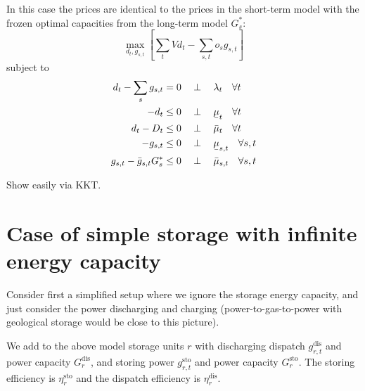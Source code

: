 \documentclass[final,3p,times]{elsarticle}
\newcommand{\ubar}[1]{\text{\b{$#1$}}}
\def\l{\lambda}
\begin{document}
In this case the prices are identical to the prices in the short-term model with the frozen optimal capacities from the long-term model $G_{s}^*$:
\begin{equation}
    \max_{d_{t}, g_{s,t}}\left[\sum_{t} V d_{t}  - \sum_{s,t} o_{s} g_{s,t} \right]  \label{eq:objs}
\end{equation}
subject to
\begin{align}
   d_{t} - \sum_s g_{s,t} & =  0 \hspace{0.34cm}\perp \hspace{0.34cm} \l_t \hspace{0.34cm} \forall t \label{eq:balance2}\\
    -d_{t} & \leq 0 \hspace{0.34cm}\perp \hspace{0.34cm} \ubar{\mu}_{t} \hspace{0.34cm} \forall t  \nonumber \\
    d_{t} - D_{t} & \leq 0 \hspace{0.34cm}\perp \hspace{0.34cm} \bar{\mu}_{t} \hspace{0.34cm} \forall t\nonumber  \\
    -g_{s,t} & \leq 0 \hspace{0.34cm}\perp \hspace{0.34cm} \ubar{\mu}_{s,t} \hspace{0.34cm} \forall s,t \nonumber \\
         g_{s,t} - \bar{g}_{s,t} G^*_s & \leq 0 \hspace{0.34cm}\perp \hspace{0.34cm} \bar{\mu}_{s,t} \hspace{0.34cm} \forall s,t \label{eq:generation}
\end{align}

Show easily via KKT.

\section{Case of simple storage with infinite energy capacity}

Consider first a simplified setup where we ignore the storage energy
capacity, and just consider the power discharging and charging
(power-to-gas-to-power with geological storage would be close to this
picture).

We add to the above model storage units $r$ with discharging dispatch $g^{\textrm{dis}}_{r,t}$ and power capacity $G^{\textrm{dis}}_{r}$, and storing power $g^{\textrm{sto}}_{r,t}$ and power capacity $G^{\textrm{sto}}_{r}$. The storing efficiency is $\eta_r^{\textrm{sto}}$ and the dispatch efficiency is $\eta_r^{\textrm{dis}}$.
\end{document}

